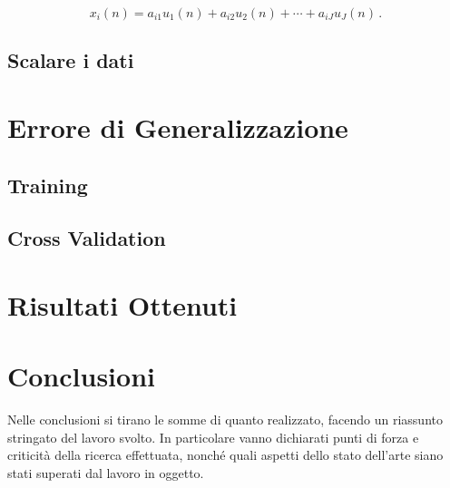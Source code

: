 \documentclass[12pt,italian]{report}
\begin{document}
\begin{equation}
x_i(n) = a_{i1}u_1(n) + a_{i2}u_2(n) + \cdots + a_{iJ}u_J(n) \, .
\label{eq:multimix}
\end{equation}

\subsection{Scalare i dati}


\section{Errore di Generalizzazione}
\label{sec:errore}


\subsection{Training}



\subsection{Cross Validation}



\section{Risultati Ottenuti}
\label{sec:risultati}


% 
% 
\section{Conclusioni}

Nelle conclusioni si tirano le somme di quanto realizzato, facendo un riassunto stringato del lavoro svolto. In particolare vanno dichiarati punti di forza e criticità della ricerca effettuata, nonché quali aspetti dello stato dell'arte siano stati superati dal lavoro in oggetto.

%
%



\end{document}
